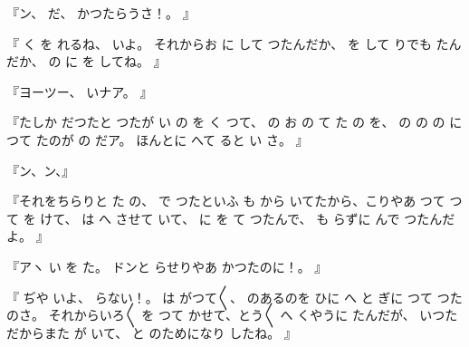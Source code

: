 『ン、
だ、
かつたらうさ！。
』

『
く
を
れるね、
いよ。
それからお
に
して
つたんだか、
を
して
りでも
たんだか、
の
に
を
してね。
』

『ヨーツー、
いナア。
』

『たしか
だつたと
つたが
い
の
を
く
つて、
の
お
の
て
た
の
を、
の
の
の
に
つて
たのが
の
だア{}。
ほんとに
へて
ると
い
さ{}。
』

『ン、ン、』

『それをちらりと
た
の、
で
つたといふ
も
から
いてたから、こりやあ
つて
つて
を
けて、
は
へ
させて
いて、
に
を
て
つたんで、
も
らずに
んで
つたんだよ。
』

『アヽ
い
を
た。
ドンと
らせりやあ
かつたのに！。
』

『
ぢや
いよ、
らない！。
は
がつて〳〵{}、
のあるのを
ひに
へ
と
ぎに
つて
つたのさ。
それからいろ〳〵
を
つて
かせて、とう〳〵
へ
くやうに
たんだが、
いつた
だからまた
が
いて、
と
のためになり
したね。
』

